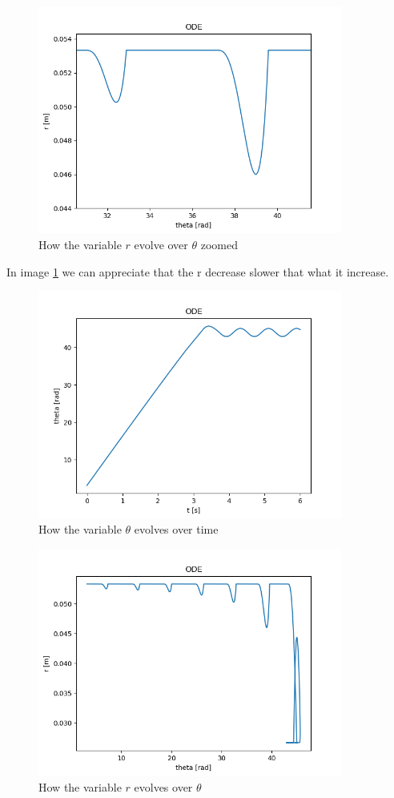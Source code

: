 \begin{figure}[H]
	\centering
	\includegraphics[width=10cm]{img/simulation/r_theta_t_zoom.png}
	\caption{How the variable $r$ evolve over $\theta$ zoomed}
	\label{fig:r theta zoom}
\end{figure}
In image \ref{fig:r theta zoom} we can appreciate that the r decrease slower that what it increase.


\begin{figure}[H]
	\centering
	\includegraphics[width=10cm]{img/simulation/theta_t.png}
	\caption{How the variable $\theta$ evolves over time}
	\label{fig:theta t diagram}
\end{figure}

\begin{figure}[H]
	\centering
	\includegraphics[width=10cm]{img/simulation/r_theta_t.png}
	\caption{How the variable $r$ evolves over $\theta$}
	\label{fig:r theta}
\end{figure}

